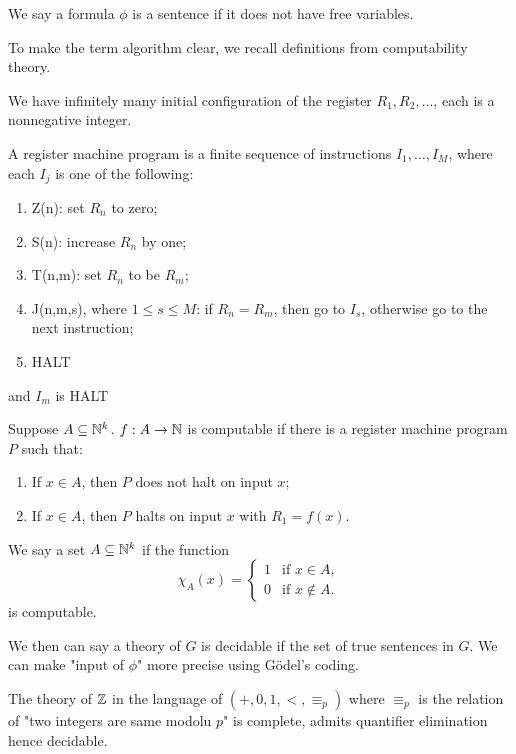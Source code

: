 \documentclass[../main.tex]{subfiles}
\begin{document}
\begin{definition}
    We say a formula $\phi$ is a sentence if it does not have free variables.
\end{definition}



To make the term algorithm clear, we recall definitions from computability theory.

We have infinitely many initial configuration of the register $R_1,R_2,\dots$, each is a nonnegative integer.

\begin{definition}
    A register machine program is a finite sequence of instructions $I_1,\dots,I_M$, where each $I_j$ is one of the following:\begin{enumerate}
        \item Z(n): set $R_n$ to zero;
        \item S(n): increase $R_n$ by one;
        \item T(n,m): set $R_n$ to be $R_m$;
        \item J(n,m,s), where $1\leq s\leq M$: if $R_n=R_m$, then go to $I_s$, otherwise go to the next instruction;
        \item HALT
    \end{enumerate}
    and $I_m$ is HALT
\end{definition}

\begin{definition}
    Suppose $A\subseteq \mathbb{N}^k$. $f:A\rightarrow \mathbb{N}$ is computable if there is a register machine program $P$ such that:\begin{enumerate}
        \item If $x\in A$, then $P$ does not halt on input $x$;
        \item If $x\in A$, then $P$ halts on input $x$ with $R_1=f(x)$.
    \end{enumerate}
\end{definition}

\begin{definition}
    We say a set $A\subseteq \mathbb{N}^k$ if the function\[
    \chi_A(x) = 
\begin{cases}
1 & \text{if } x \in A, \\
0 & \text{if } x \notin A.
\end{cases}
    \]
    is computable.
\end{definition}

We then can say a theory of $G$ is decidable if the set of true sentences in $G$. We can make "input of $\phi$" more precise using G\"odel's coding.

\begin{theorem}
    The theory of $\mathbb{Z}$ in the language of $(+,0,1,<,\equiv_p)$ where $\equiv_p$ is the relation of "two integers are same modolu $p$" is complete, admits quantifier elimination hence decidable.
\end{theorem}
\end{document}
